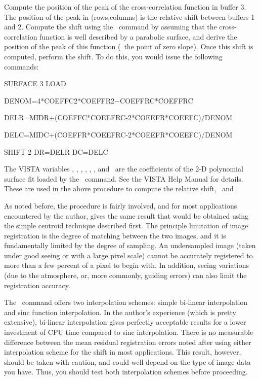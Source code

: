 Compute the position of the peak of the cross-correlation function in buffer
3.  The position of the peak in (rows,columns) is the relative shift between
buffers 1 and 2.  Compute the shift using the \ command by
assuming that the cross-correlation function is well described by a parabolic
surface, and derive the position of the peak of this function (\ie\ the
point of zero slope).  Once this shift is computed, perform the shift.  To do
this, you would issue the following commands: 
\begin{command}
      \item SURFACE 3 LOAD
      \item DENOM=4*COEFFC2*COEFFR2$-$COEFFRC*COEFFRC
      \item DELR=MIDR+(COEFFC*COEEFRC-2*COEEFR*COEEFC)/DENOM
      \item DELC=MIDC+(COEFFR*COEEFRC-2*COEEFR*COEEFC)/DENOM
      \item SHIFT 2 DR=DELR DC=DELC 
\end{command}
The VISTA variables , , ,
, , , and \ are the
coefficients of the 2-D polynomial surface fit loaded by the \
command.  See the VISTA Help Manual for details. These are used in the above
procedure to compute the relative shift, \comm{DELR}\ and \comm{DELC}. 

As noted before, the procedure is fairly involved, and for most applications
encountered by the author, gives the same result that would be obtained using
the simple centroid technique described first.  The principle limitation of
image registration is the degree of matching between the two images, and it is
fundamentally limited by the degree of sampling.  An undersampled image (taken
under good seeing or with a large pixel scale) cannot be accurately registered
to more than a few percent of a pixel to begin with. In addition, seeing
variations (due to the atmosphere, or, more commonly, guiding errors) can also
limit the registration accuracy. 

The \ command offers two interpolation schemes: simple bi-linear
interpolation and sinc function interpolation.  In the author's experience
(which is pretty extensive), bi-linear interpolation gives perfectly
acceptable results for a lower investment of CPU time compared to sinc
interpolation.  There is no measurable difference between the mean residual
registration errors noted after using either interpolation scheme for the
shift in most applications.  This result, however, should be taken with
caution, and could well depend on the type of image data you have.  Thus, you
should test both interpolation schemes before proceeding. 


